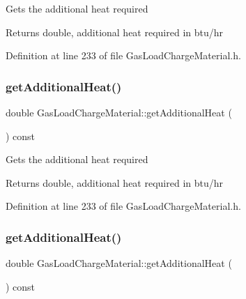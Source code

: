 Gets the additional heat required

\begin{DoxyReturn}{Returns}
double, additional heat required in btu/hr 
\end{DoxyReturn}


Definition at line 233 of file Gas\+Load\+Charge\+Material.\+h.

\mbox{\label{class_gas_load_charge_material_a5c01f171b61c01c93db6453cb122e1ba}} 
\subsubsection{\texorpdfstring{get\+Additional\+Heat()}{getAdditionalHeat()}\hspace{0.1cm}{\footnotesize\ttfamily [2/3]}}
{\footnotesize\ttfamily double Gas\+Load\+Charge\+Material\+::get\+Additional\+Heat (\begin{DoxyParamCaption}{ }\end{DoxyParamCaption}) const\hspace{0.3cm}{\ttfamily [inline]}}

Gets the additional heat required

\begin{DoxyReturn}{Returns}
double, additional heat required in btu/hr 
\end{DoxyReturn}


Definition at line 233 of file Gas\+Load\+Charge\+Material.\+h.

\mbox{\label{class_gas_load_charge_material_a5c01f171b61c01c93db6453cb122e1ba}} 
\subsubsection{\texorpdfstring{get\+Additional\+Heat()}{getAdditionalHeat()}\hspace{0.1cm}{\footnotesize\ttfamily [3/3]}}
{\footnotesize\ttfamily double Gas\+Load\+Charge\+Material\+::get\+Additional\+Heat (\begin{DoxyParamCaption}{ }\end{DoxyParamCaption}) const\hspace{0.3cm}{\ttfamily [inline]}}

